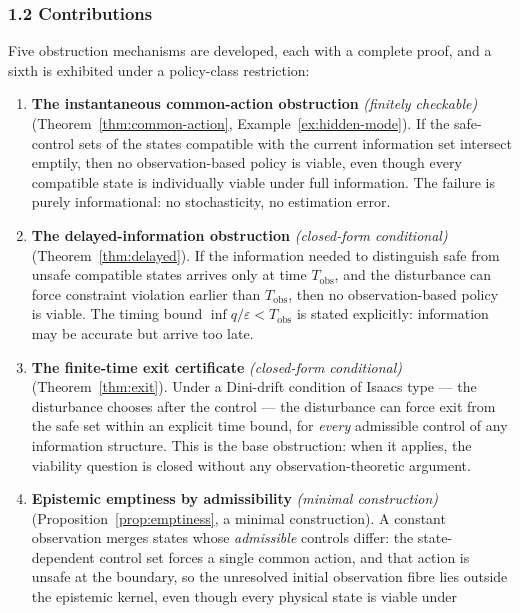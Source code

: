 \documentclass[10pt,twocolumn]{article}
\theoremstyle{definition}
\begin{document}
\subsubsection{1.2 Contributions}\label{contributions}

Five obstruction mechanisms are developed, each with a complete proof,
and a sixth is exhibited under a policy-class restriction:

\begin{enumerate}
\def\labelenumi{\arabic{enumi}.}
\item
  \textbf{The instantaneous common-action obstruction} \emph{(finitely checkable)} (Theorem~\ref{thm:common-action},
  Example~\ref{ex:hidden-mode}). If the safe-control sets of the states compatible with the
  current information set intersect emptily, then no observation-based
  policy is viable, even though every compatible state is individually
  viable under full information. The failure is purely informational: no
  stochasticity, no estimation error.
\item
  \textbf{The delayed-information obstruction} \emph{(closed-form conditional)} (Theorem~\ref{thm:delayed}). If the
  information needed to distinguish safe from unsafe compatible states
  arrives only at time \(T_{\mathrm{obs}}\), and the disturbance can
  force constraint violation earlier than \(T_{\mathrm{obs}}\), then no
  observation-based policy is viable. The timing bound
  \(\inf q / \varepsilon < T_{\mathrm{obs}}\) is stated explicitly:
  information may be accurate but arrive too late.
\item
  \textbf{The finite-time exit certificate} \emph{(closed-form conditional)} (Theorem~\ref{thm:exit}). Under a
  Dini-drift condition of Isaacs type --- the disturbance chooses after
  the control --- the disturbance can force exit from the safe set
  within an explicit time bound, for \emph{every} admissible control of
  any information structure. This is the base obstruction: when it
  applies, the viability question is closed without any
  observation-theoretic argument.
\item
  \textbf{Epistemic emptiness by admissibility} \emph{(minimal construction)} (Proposition~\ref{prop:emptiness}, a minimal
  construction). A constant observation merges states whose
  \emph{admissible} controls differ: the state-dependent control set
  forces a single common action, and that action is unsafe at the
  boundary, so the unresolved initial observation fibre lies outside the
  epistemic kernel, even though every physical state is viable under

\end{enumerate}
\end{document}

